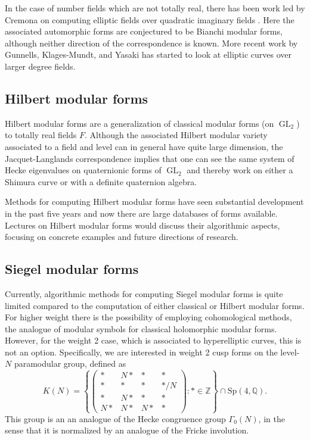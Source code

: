 \documentclass[12pt]{amsart}
\DeclareMathOperator{\GL}{GL}
\numberwithin{equation}{section}
\newcommand{\Q}{\mathbb Q}
\newcommand{\Z}{\mathbb Z}
\begin{document}
In the case of number fields which are not totally real, there has
been work led by Cremona on computing elliptic fields over quadratic
imaginary fields \cite{cremona1, cremona-lingham, cremona}.  Here the
associated automorphic forms are
conjectured to be Bianchi modular forms, although neither direction of
the correspondence is known.  More recent work by Gunnells,
Klages-Mundt, and Yasaki \cite{complexcubic, neg23,quartic}
has started to look at elliptic curves over larger degree
fields.

\subsection{Hilbert modular forms}

Hilbert modular forms are a generalization of classical modular forms
(on $\GL_2$) to totally real fields $F$.  Although the associated 
Hilbert modular variety associated to a field and level can in general
have quite large dimension, the Jacquet-Langlands correspondence
implies that one can see the same system of Hecke eigenvalues
on quaternionic forms of $\GL_2$ and thereby work on either
a Shimura curve or with a definite quaternion algebra.

Methods for computing Hilbert modular forms have seen substantial
development in the past five years and now there are large databases
of forms available.  Lectures on Hilbert modular forms would discuss
their algorithmic aspects, focusing on concrete examples and 
future directions of research.

\subsection{Siegel modular forms}

Currently, algorithmic methods for computing Siegel modular 
forms is quite limited compared to
the computation of either classical or Hilbert modular forms.  For
higher weight there is the possibility of employing cohomological
methods, the analogue of modular symbols for classical holomorphic
modular forms.  However, for the weight 2 case, which is associated
to hyperelliptic curves, this is not an option.  Specifically, we are
interested in weight 2 cusp forms on the level-$N$ paramodular group,
defined as
$$
K(N)=\left\{
\left(\begin{matrix}
  * & N* & * &*\\
* & * & * & */N\\
* & N* &*&*\\
N*&N*&N*&*
\end{matrix}\right)
:
*\in{\Z}\right\}\cap \mathrm{Sp}(4, \Q).
$$
This group is an an analogue of the Hecke congruence group
$\Gamma_0(N)$, in the sense that it is normalized by an analogue of
the Fricke involution.
\end{document}
